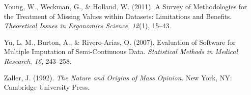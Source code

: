 \documentclass[12pt,econ]{sources/authesis}
\newenvironment{CSLReferences}%
  {}%
  {\par}
\begin{document}
\begin{CSLReferences}{1}{0}
\leavevmode{}%
Young, W., Weckman, G., \& Holland, W. (2011). {A Survey of Methodologies for the Treatment of Missing Values within Datasets: Limitations and Benefits}. \emph{Theoretical Issues in Ergonomics Science}, \emph{12}(1), 15--43.

\leavevmode{}%
Yu, L. M., Burton, A., \& Rivero-Arias, O. (2007). {Evaluation of Software for Multiple Imputation of Semi-Continuous Data}. \emph{Statistical Methods in Medical Research}, \emph{16}, 243--258.

\leavevmode{}%
Zaller, J. (1992). \emph{The {Nature} and {Origins} of {Mass} {Opinion}}. New York, NY: Cambridge University Press.

\end{CSLReferences}
\end{document}
